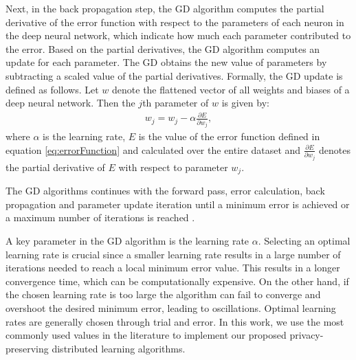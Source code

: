 \documentclass[letterpaper]{article}
\begin{document}
\begin{flushleft}
{%
Next, in the back propagation step, the GD algorithm 
computes the partial derivative of the error function with respect to the
parameters of each neuron in the deep neural network, which indicate how much each parameter contributed to
the error. Based on the partial derivatives, the GD algorithm computes an update for each parameter. 
The GD  obtains the new value of parameters by subtracting a scaled value of the partial derivatives. Formally, the GD update is
defined as follows.  Let $w$ denote the flattened vector of all weights and biases of a deep neural
network. Then the $j$th parameter of $w$ is given by:
\begin{align}\label{eq:GD}
w_j = w_j -\alpha \frac{\partial E}{\partial w_j}, 
\end{align}
where $\alpha$ is the learning rate,  $E$ is the value of the error function defined in equation \eqref{eq:errorFunction} and calculated over the entire dataset and $\frac{\partial E}{\partial w_j}$ denotes the partial derivative of $E$ with respect to
parameter $w_j$.

The GD algorithms continues with the forward pass, error calculation, back propagation and parameter update iteration until a minimum
error is achieved or a maximum number of iterations is reached \cite{ruder2016overview}. 

A key parameter in the GD algorithm is the learning rate $\alpha$.   Selecting an optimal learning
rate is crucial since a smaller learning rate results in a large number of iterations needed to reach a local minimum error value. This
results in a longer convergence time, which can be computationally expensive. On the other hand, if the chosen learning rate is too
large the algorithm can fail to converge and overshoot the desired minimum error, leading to oscillations.  Optimal learning rates are
generally chosen through trial and error. In this work, we use the most commonly used values in the literature to implement our
proposed privacy-preserving distributed learning algorithms. 

}
\end{flushleft}
\end{document}
